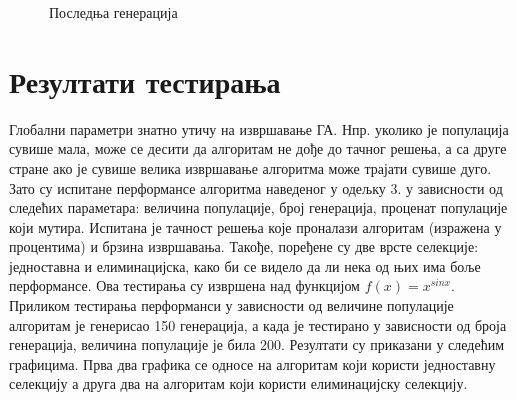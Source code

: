 \documentclass{article}
\begin{document}
\begin{figure}[H]
    \centering

    \caption{Последња генерација}
\end{figure}

\section{Резултати тестирања}
Глобални параметри знатно утичу на извршавање ГА. Нпр. уколико је популација сувише мала,
може се десити да алгоритам не дође до тачног решења, а са друге стране ако је сувише велика
извршавање алгоритма може трајати сувише дуго. Зато су испитане перформансе алгоритма наведеног
у одељку 3. у зависности од следећих параметара: величина популације, број генерација, проценат 
популације који мутира. Испитана је тачност решења које проналази алгоритам (изражена у процентима)
и брзина извршавања. Такође, поређене су две врсте селекције: једноставна и елиминацијска, како би
се видело да ли нека од њих има боље перформансе. Ова тестирања су извршена над функцијом $f(x) = x^{sin x}$.
Приликом тестирања перформанси у зависности од величине популације алгоритам је генерисао 150 генерација,
а када је тестирано у зависности од броја генерација, величина популације је била 200.
Резултати су приказани у следећим графицима. Прва два графика се односе на алгоритам који користи једноставну селекцију
а друга два на алгоритам који користи елиминацијску селекцију.
\end{document}
